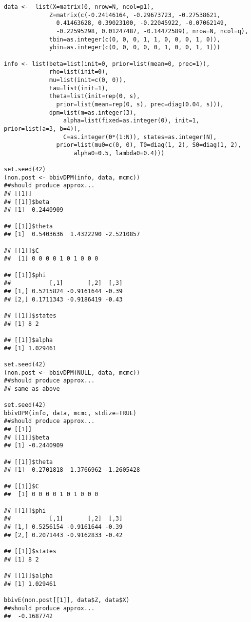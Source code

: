 \documentclass[12pt,oneside]{article}
\begin{document}
\begin{verbatim}
data <-  list(X=matrix(0, nrow=N, ncol=p1),
             Z=matrix(c(-0.24146164, -0.29673723, -0.27538621,
               0.41463628, 0.39023100, -0.22045922, -0.07062149,
               -0.22595298, 0.01247487, -0.14472589), nrow=N, ncol=q),
             tbin=as.integer(c(0, 0, 0, 1, 1, 0, 0, 0, 1, 0)),
             ybin=as.integer(c(0, 0, 0, 0, 0, 1, 0, 0, 1, 1)))

info <- list(beta=list(init=0, prior=list(mean=0, prec=1)),
             rho=list(init=0),
             mu=list(init=c(0, 0)),
             tau=list(init=1),
             theta=list(init=rep(0, s),
               prior=list(mean=rep(0, s), prec=diag(0.04, s))),
             dpm=list(m=as.integer(3),
                 alpha=list(fixed=as.integer(0), init=1, prior=list(a=3, b=4)),
                 C=as.integer(0*(1:N)), states=as.integer(N),
               prior=list(mu0=c(0, 0), T0=diag(1, 2), S0=diag(1, 2),
                    alpha0=0.5, lambda0=0.4)))

set.seed(42)
(non.post <- bbivDPM(info, data, mcmc))
##should produce approx...
## [[1]]
## [[1]]$beta
## [1] -0.2440909

## [[1]]$theta
## [1]  0.5403636  1.4322290 -2.5210857

## [[1]]$C
##  [1] 0 0 0 0 1 0 1 0 0 0

## [[1]]$phi
##           [,1]       [,2]  [,3]
## [1,] 0.5215824 -0.9161644 -0.39
## [2,] 0.1711343 -0.9186419 -0.43

## [[1]]$states
## [1] 8 2

## [[1]]$alpha
## [1] 1.029461

set.seed(42)
(non.post <- bbivDPM(NULL, data, mcmc))
##should produce approx...
## same as above

set.seed(42)
bbivDPM(info, data, mcmc, stdize=TRUE)
##should produce approx...
## [[1]]
## [[1]]$beta
## [1] -0.2440909

## [[1]]$theta
## [1]  0.2701818  1.3766962 -1.2605428

## [[1]]$C
##  [1] 0 0 0 0 1 0 1 0 0 0

## [[1]]$phi
##           [,1]       [,2]  [,3]
## [1,] 0.5256154 -0.9161644 -0.39
## [2,] 0.2071443 -0.9162833 -0.42

## [[1]]$states
## [1] 8 2

## [[1]]$alpha
## [1] 1.029461

bbivE(non.post[[1]], data$Z, data$X)
##should produce approx...
##  -0.1687742
\end{verbatim}



\end{document}
